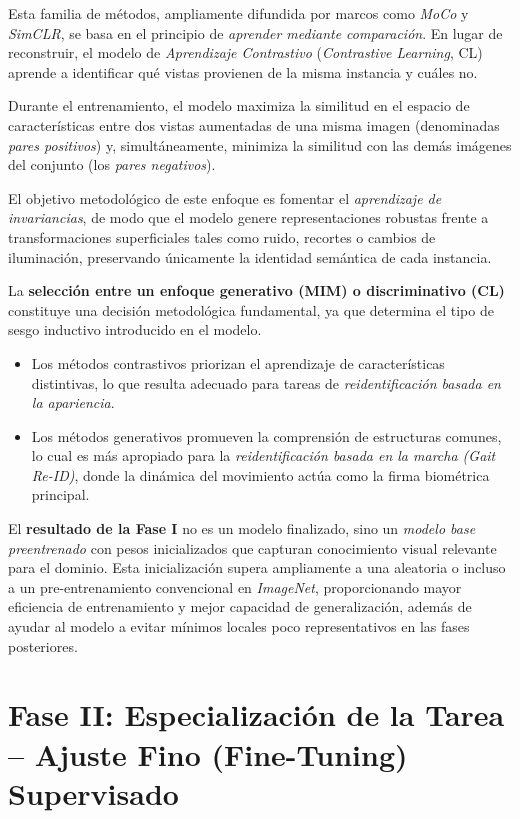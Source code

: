 Esta familia de métodos, ampliamente difundida por marcos como \textit{MoCo} y \textit{SimCLR}, se basa en el principio de \textit{aprender mediante comparación}. En lugar de reconstruir, el modelo de \textit{Aprendizaje Contrastivo} (\textit{Contrastive Learning}, CL) aprende a identificar qué vistas provienen de la misma instancia y cuáles no.  

Durante el entrenamiento, el modelo maximiza la similitud en el espacio de características entre dos vistas aumentadas de una misma imagen (denominadas \textit{pares positivos}) y, simultáneamente, minimiza la similitud con las demás imágenes del conjunto (los \textit{pares negativos}).  

El objetivo metodológico de este enfoque es fomentar el \textit{aprendizaje de invariancias}, de modo que el modelo genere representaciones robustas frente a transformaciones superficiales tales como ruido, recortes o cambios de iluminación, preservando únicamente la identidad semántica de cada instancia.  

La \textbf{selección entre un enfoque generativo (MIM) o discriminativo (CL)} constituye una decisión metodológica fundamental, ya que determina el tipo de sesgo inductivo introducido en el modelo.  
\begin{itemize}
    \item Los métodos contrastivos priorizan el aprendizaje de características distintivas, lo que resulta adecuado para tareas de \textit{reidentificación basada en la apariencia}.
    \item Los métodos generativos promueven la comprensión de estructuras comunes, lo cual es más apropiado para la \textit{reidentificación basada en la marcha (Gait Re-ID)}, donde la dinámica del movimiento actúa como la firma biométrica principal.
\end{itemize}

El \textbf{resultado de la Fase I} no es un modelo finalizado, sino un \textit{modelo base preentrenado} con pesos inicializados que capturan conocimiento visual relevante para el dominio. Esta inicialización supera ampliamente a una aleatoria o incluso a un pre-entrenamiento convencional en \textit{ImageNet}, proporcionando mayor eficiencia de entrenamiento y mejor capacidad de generalización, además de ayudar al modelo a evitar mínimos locales poco representativos en las fases posteriores.  

\section{Fase II: Especialización de la Tarea – Ajuste Fino (Fine-Tuning) Supervisado}

